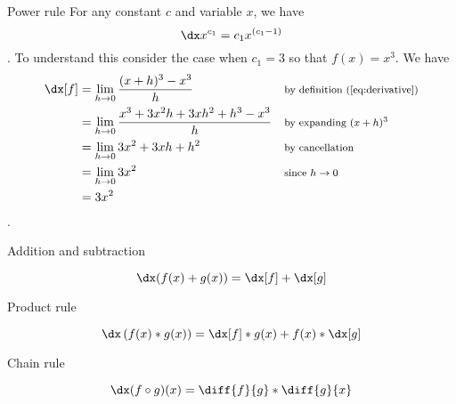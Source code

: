 \begin{psec}{Power rule}\label{rule:derivative powers} For any constant $c$ and
    variable $x$, we have
    \begin{equation}\label{eq:derivative power}
        \dx x^{c_1} = c_1 x^{(c_1 - 1)}
    \end{equation}
    . To understand this consider the case when $c_1=3$ so that $f(x) = x^3$. We have
    \begin{align*}
        \dx[f] &= \lim_{h\rightarrow 0} \frac{(x + h)^3 - x^3}{h} & &
        \text{\footnotesize by definition (\ref{eq:derivative})}\\
               &= \lim_{h\rightarrow 0} \frac{x^3 +3x^2h + 3xh^2 + h^3 -
               x^3}{h} & & \text{\footnotesize by expanding $(x + h)^3$}\\
               &= \lim_{h\rightarrow 0} 3x^2 + 3xh + h^2 & &
               \text{\footnotesize by cancellation}\\
               &= \lim_{h\rightarrow 0} 3x^2 & & \text{\footnotesize since $h\rightarrow 0$} \\
               &= 3x^2 & \text{}
    \end{align*}.

\end{psec}

\begin{psec}{Addition and subtraction}\label{rule:derivative add}

    \begin{equation}\label{eq:derivative add}
        \dx (f(x) + g(x)) = \dx[f] + \dx[g]
    \end{equation}

\end{psec}

\begin{psec}{Product rule}\label{rule:derivative product}

    \begin{equation}\label{eq:derivative prod}
        \dx \left(f(x)*g(x)\right) = \dx[f] *  g(x) + f(x) *
        \dx[g]
    \end{equation}

\end{psec}

\begin{psec}{Chain rule}\label{rule:derivative chain}

    \begin{equation}\label{eq:derivative chain}
        \dx (f \circ g)(x) = \diff{f}{g} * \diff{g}{x}
    \end{equation}

\end{psec}


